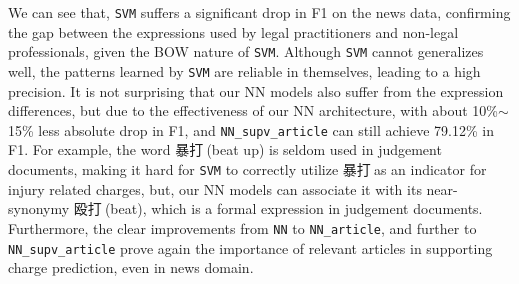 We can see that, \texttt{SVM} suffers a significant drop in F1 on the news data, %
confirming the gap between the expressions used by legal practitioners and non-legal professionals,
given the BOW nature of \texttt{SVM}.
Although \texttt{SVM} cannot generalizes well, the patterns learned by \texttt{SVM} are reliable in themselves, leading to a high precision.
It is not surprising that our NN models also suffer from the expression differences, %
but due to the effectiveness of our NN architecture, with about 10\%$\sim$15\% less absolute drop in F1, and \texttt{NN\_supv\_article} can still achieve 79.12\% in F1. %
For example, the word 暴打$\ $(beat up) is seldom used in judgement documents,
making it hard for \texttt{SVM} to correctly utilize  暴打$\ $as an indicator for injury related charges, but, %
our NN models can associate it with its  near-synonymy  殴打$\ $(beat), which is a formal expression in judgement documents.
Furthermore, the clear improvements from \texttt{NN} to \texttt{NN\_article}, and further to \texttt{NN\_supv\_article} prove again the importance of relevant articles 
in supporting charge prediction, even in news domain.



